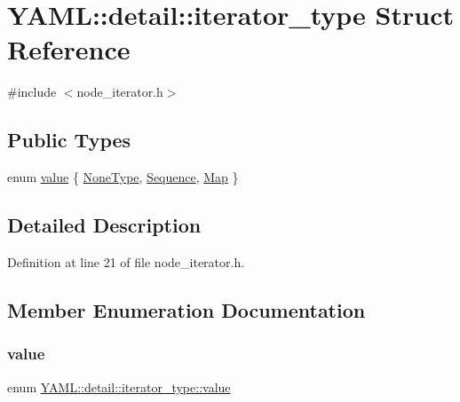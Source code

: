 \hypertarget{struct_y_a_m_l_1_1detail_1_1iterator__type}{}\section{Y\+A\+ML\+::detail\+::iterator\+\_\+type Struct Reference}
\label{struct_y_a_m_l_1_1detail_1_1iterator__type}


{\ttfamily \#include $<$node\+\_\+iterator.\+h$>$}

\subsection*{Public Types}
\begin{DoxyCompactItemize}
\item 
enum \mbox{\hyperlink{struct_y_a_m_l_1_1detail_1_1iterator__type_a519b5a5c9c39274abe04ec2b1aedd819}{value}} \{ \mbox{\hyperlink{struct_y_a_m_l_1_1detail_1_1iterator__type_a519b5a5c9c39274abe04ec2b1aedd819a9be3427144f53a0856d0c75664f7a39b}{None\+Type}}, 
\mbox{\hyperlink{struct_y_a_m_l_1_1detail_1_1iterator__type_a519b5a5c9c39274abe04ec2b1aedd819a634cbb2699d2511af6accef4676b2902}{Sequence}}, 
\mbox{\hyperlink{struct_y_a_m_l_1_1detail_1_1iterator__type_a519b5a5c9c39274abe04ec2b1aedd819afa05cea0285952aed559f8c0284f50e0}{Map}}
 \}
\end{DoxyCompactItemize}


\subsection{Detailed Description}


Definition at line 21 of file node\+\_\+iterator.\+h.



\subsection{Member Enumeration Documentation}
\mbox{\label{struct_y_a_m_l_1_1detail_1_1iterator__type_a519b5a5c9c39274abe04ec2b1aedd819}} 
\subsubsection{\texorpdfstring{value}{value}}
{\footnotesize\ttfamily enum \mbox{\hyperlink{struct_y_a_m_l_1_1detail_1_1iterator__type_a519b5a5c9c39274abe04ec2b1aedd819}{Y\+A\+M\+L\+::detail\+::iterator\+\_\+type\+::value}}}

